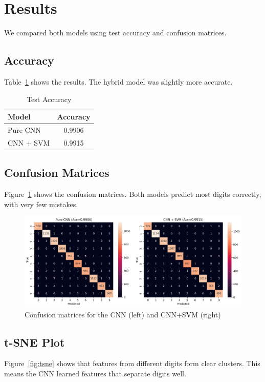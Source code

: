 \documentclass{article}
\begin{document}
\section{Results}
We compared both models using test accuracy and confusion matrices.

\subsection{Accuracy}
Table~\ref{tab:accuracy} shows the results. The hybrid model was slightly more accurate.

\begin{table}[h!]
\centering
\caption{Test Accuracy}
\label{tab:accuracy}
\begin{tabular}{lc}
\toprule
Model & Accuracy \\
\midrule
Pure CNN & 0.9906 \\
CNN + SVM & 0.9915 \\
\bottomrule
\end{tabular}
\end{table}

\subsection{Confusion Matrices}
Figure~\ref{fig:confusion_matrix} shows the confusion matrices. Both models predict most digits correctly, with very few mistakes.

\begin{figure}[h!]
\centering
\includegraphics[width=\textwidth]{cnn-svm.png} 
\caption{Confusion matrices for the CNN (left) and CNN+SVM (right)}
\label{fig:confusion_matrix}
\end{figure}

\subsection{t-SNE Plot}
Figure~\ref{fig:tsne} shows that features from different digits form clear clusters. This means the CNN learned features that separate digits well.
\end{document}
